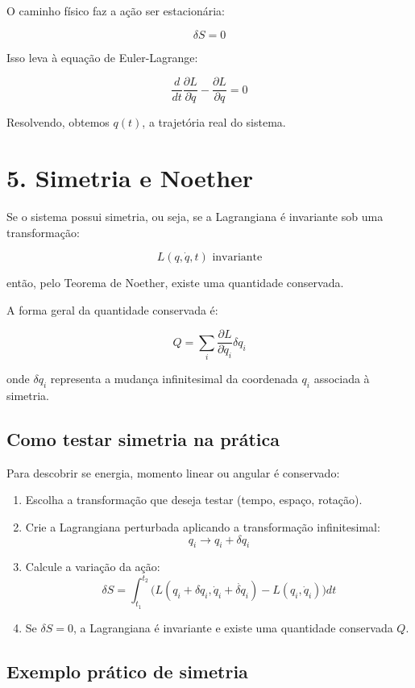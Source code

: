 \documentclass[12pt]{article}
\begin{document}
O caminho físico faz a ação ser estacionária:

\[
\delta S = 0
\]

Isso leva à equação de Euler-Lagrange:

\[
\frac{d}{dt} \frac{\partial L}{\partial \dot{q}} - \frac{\partial L}{\partial q} = 0
\]

Resolvendo, obtemos $q(t)$, a trajetória real do sistema.

\section*{5. Simetria e Noether}

Se o sistema possui simetria, ou seja, se a Lagrangiana é invariante sob uma transformação:

\[
L(q, \dot{q}, t) \text{ invariante}
\]

então, pelo Teorema de Noether, existe uma quantidade conservada.

A forma geral da quantidade conservada é:

\[
Q = \sum_i \frac{\partial L}{\partial \dot{q}_i} \delta q_i
\]

onde $\delta q_i$ representa a mudança infinitesimal da coordenada $q_i$ associada à simetria.

\subsection*{Como testar simetria na prática}

Para descobrir se energia, momento linear ou angular é conservado:

\begin{enumerate}
    \item Escolha a transformação que deseja testar (tempo, espaço, rotação).  
    \item Crie a Lagrangiana perturbada aplicando a transformação infinitesimal:  
    \[
    q_i \to q_i + \delta q_i
    \]  
    \item Calcule a variação da ação:  
    \[
    \delta S = \int_{t_1}^{t_2} \big( L(q_i + \delta q_i, \dot{q}_i + \dot{\delta q}_i) - L(q_i, \dot{q}_i) \big) dt
    \]  
    \item Se $\delta S = 0$, a Lagrangiana é invariante e existe uma quantidade conservada $Q$.  
\end{enumerate}

\subsection*{Exemplo prático de simetria}
\end{document}

